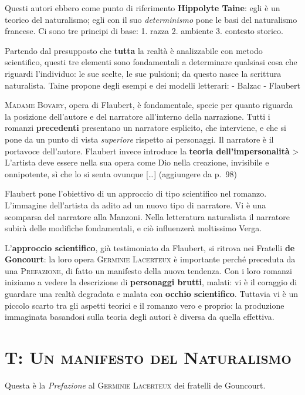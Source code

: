 \documentclass{book}
\begin{document}
Questi autori ebbero come punto di riferimento \textbf{Hippolyte Taine}:
egli è un teorico del naturalismo; egli con il suo \emph{determinismo}
pone le basi del naturalismo francese. Ci sono tre principi di base: 1.
razza 2. ambiente 3. contesto storico.

Partendo dal presupposto che \textbf{tutta} la realtà è analizzabile con
metodo scientifico, questi tre elementi sono fondamentali a determinare
qualsiasi cosa che riguardi l'individuo: le sue scelte, le sue pulsioni;
da questo nasce la scrittura naturalista. Taine propone degli esempi e
dei modelli letterari: - Balzac - Flaubert

\textsc{Madame Bovary}, opera di Flaubert, è fondamentale, specie per
quanto riguarda la posizione dell'autore e del narratore all'interno
della narrazione. Tutti i romanzi \textbf{precedenti} presentano un
narratore esplicito, che interviene, e che si pone da un punto di vista
\emph{superiore} rispetto ai personaggi. Il narratore è il portavoce
dell'autore. Flaubert invece introduce la \textbf{teoria
dell'impersonalità} \textgreater{} L'artista deve essere nella sua opera
come Dio nella creazione, invisibile e onnipotente, sì che lo si senta
ovunque {[}\ldots{]} (aggiungere da p.~98)

Flaubert pone l'obiettivo di un approccio di tipo scientifico nel
romanzo. L'immagine dell'artista da adito ad un nuovo tipo di narratore.
Vi è una scomparsa del narratore alla Manzoni. Nella letteratura
naturalista il narratore subirà delle modifiche fondamentali, e ciò
influenzerà moltissimo Verga.

L'\textbf{approccio scientifico}, già testimoniato da Flaubert, si
ritrova nei Fratelli \textbf{de Goncourt}: la loro opera \textsc{Germinie
Lacerteux} è importante perché preceduta da una \textsc{Prefazione}, di
fatto un manifesto della nuova tendenza. Con i loro romanzi iniziamo a
vedere la descrizione di \textbf{personaggi brutti}, malati: vi è il
coraggio di guardare una realtà degradata e malata con \textbf{occhio
scientifico}. Tuttavia vi è un piccolo scarto tra gli aspetti teorici e
il romanzo vero e proprio: la produzione immaginata basandosi sulla
teoria degli autori è diversa da quella effettiva.

\section{T: \textsc{Un manifesto del Naturalismo}}

Questa è la \emph{Prefazione} al \textsc{Germinie Lacerteux} dei fratelli
de Gouncourt.
\end{document}
